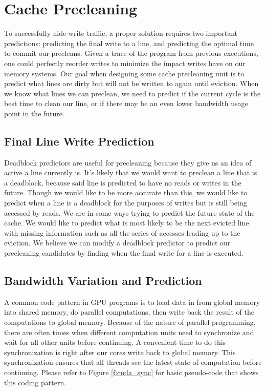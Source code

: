 \section{Cache Precleaning}

To successfully hide write traffic, a proper solution requires two important predictions: predicting the final write to a line, and predicting the optimal time to commit our precleans. Given a trace of the program from previous executions, one could perfectly reorder writes to minimize the impact writes have on our memory systems. Our goal when designing some cache precleaning unit is to predict what lines are dirty but will not be written to again until eviction. When we know what lines we can preclean, we need to predict if the current cycle is the best time to clean our line, or if there may be an even lower bandwidth usage point in the future.  

\subsection{Final Line Write Prediction}
Deadblock predictors are useful for precleaning because they give us an idea of active a line currently is. It's likely that we would want to preclean a line that is a deadblock, because said line is predicted to have no reads or writes in the future. Though we would like to be more accurate than this, we would like to predict when a line is a deadblock for the purposes of writes but is still being accessed by reads. We are in some ways trying to predict the future state of the cache. We would like to predict what is most likely to be the next evicted line with missing information such as all the series of accesses leading up to the eviction. We believe we can modify a deadblock predictor to predict our precleaning candidates by finding when the final write for a line is executed.

\subsection{Bandwidth Variation and Prediction}
A common code pattern in GPU programs is to load data in from global memory into shared memory, do parallel computations, then write back the result of the computations to global memory. Because of the nature of parallel programming, there are often times when different computation units need to synchronize and wait for all other units before continuing. A convenient time to do this synchronization is right after our cores write back to global memory. This synchronization ensures that all threads see the latest state of computation before continuing. Please refer to Figure \ref{f:cuda_sync} for basic pseudo-code that shows this coding pattern.

